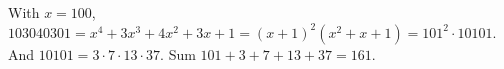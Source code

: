 With $x=100$, $103040301=x^4+3x^3+4x^2+3x+1=(x+1)^2(x^2+x+1)=101^2\cdot10101$. And $10101=3\cdot7\cdot13\cdot37$. Sum $101+3+7+13+37=\boxed{161}$.
